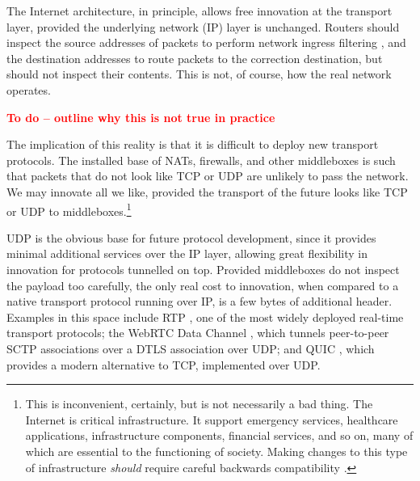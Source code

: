 \documentclass[10pt]{sig-alternate-05-2015}
\newcommand{\todo}[1]{\textbf{\textcolor{red}{To do -- #1}}}
\begin{document}
The Internet architecture, in principle, allows free innovation at the
transport layer, provided the underlying network (IP) layer is unchanged.
Routers should inspect the source addresses of packets to perform network
ingress filtering \cite{rfc:2827}, and the destination addresses to route
packets to the correction destination, but should not inspect their
contents. This is not, of course, how the real network operates.

\todo{outline why this is not true in practice}

The implication of this reality is that it is difficult to deploy new
transport protocols. The installed base of NATs, firewalls, and other
middleboxes is such that packets that do not look like TCP or UDP are
unlikely to pass the network. We may innovate all we like, provided the
transport of the future looks like TCP or UDP to middleboxes.\footnote{
  This is inconvenient, certainly, but is not necessarily a bad thing.
  The Internet is critical infrastructure. It support emergency services,
  healthcare applications, infrastructure components, financial services,
  and so on, many of which are essential to the functioning of society.
  Making changes to this type of infrastructure \emph{should} require
  careful backwards compatibility \cite{mcquistin:2015:reinterpreting}.
}

UDP is the obvious base for future protocol development, since it provides
minimal additional services over the IP layer, allowing great flexibility
in innovation for protocols tunnelled on top. Provided middleboxes do not
inspect the payload too carefully, the only real cost to innovation, when
compared to a native transport protocol running over IP, is a few bytes of
additional header. Examples in this space include RTP \cite{rfc:3550}, one
of the most widely deployed real-time transport protocols; the WebRTC Data
Channel \cite{draft-ietf-rtcweb-data-channel-13}, which tunnels
peer-to-peer SCTP associations over a DTLS association over UDP; and QUIC
\cite{draft-tsvwg-quic-protocol-02}, which provides a modern alternative
to TCP, implemented over UDP.
\end{document}
